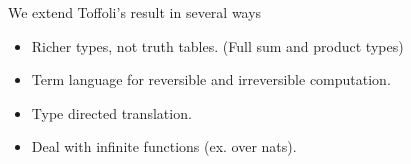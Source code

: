 \documentclass[svgnames,11pt]{beamer}
\begin{document}

\begin{frame} {We extend Toffoli's result in several ways}

  \begin{itemize}

 \vfill
  \item Richer types, not truth tables. (Full sum and product types)

    \vfill
  \item Term language for reversible and irreversible computation.

    \vfill
  \item Type directed translation.

    \vfill
  \item Deal with infinite functions (ex. over nats).
  \end{itemize}
\end{frame}


\begin{frame}
  
    \begin{center}
    \end{center}


\end{frame}
\end{document}
